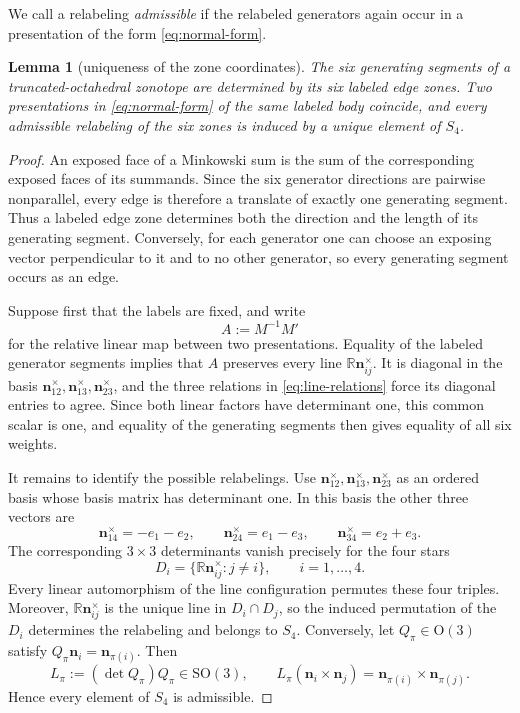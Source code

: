 \documentclass[11pt]{article}
\newcommand{\R}{\mathbb R}
\newcommand{\mb}[1]{\mathbf{#1}}
\newtheorem{lemma}[lemma]{Lemma}
\theoremstyle{remark}
\begin{document}
We call a relabeling \emph{admissible} if the relabeled generators again occur in a
presentation of the form \eqref{eq:normal-form}.

\begin{lemma}[uniqueness of the zone coordinates]\label{lem:zone-uniqueness}
The six generating segments of a truncated-octahedral zonotope are determined by
its six labeled edge zones.  Two presentations in \eqref{eq:normal-form} of the same
labeled body coincide, and every admissible relabeling of the six zones is induced by a
unique element of $S_4$.
\end{lemma}

\begin{proof}
An exposed face of a Minkowski sum is the sum of the corresponding exposed faces of its
summands.  Since the six generator directions are pairwise nonparallel, every edge is
therefore a translate of exactly one generating segment.  Thus a labeled edge zone
determines both the direction and the length of its generating segment.  Conversely, for
each generator one can choose an exposing vector perpendicular to it and to no other
generator, so every generating segment occurs as an edge.

Suppose first that the labels are fixed, and write $$A:=M^{-1}M'$$ for the relative linear map
between two presentations.  Equality of the labeled generator segments implies that $A$
preserves every line $\R\mb n_{ij}^{\times}$.  It is diagonal in the basis
$\mb n_{12}^{\times},\mb n_{13}^{\times},\mb n_{23}^{\times}$, and the three relations
in \eqref{eq:line-relations} force its diagonal entries to agree.  Since both linear
factors have determinant one, this common scalar is one, and equality of the generating
segments then gives equality of all six weights.

It remains to identify the possible relabelings.  Use
$\mb n_{12}^{\times},\mb n_{13}^{\times},\mb n_{23}^{\times}$ as an ordered basis whose basis matrix has determinant one.  In this basis the other three vectors are
\[
 \mb n_{14}^{\times}=-e_1-e_2,\qquad
 \mb n_{24}^{\times}=e_1-e_3,\qquad
 \mb n_{34}^{\times}=e_2+e_3.
\]
The corresponding $3\times3$ determinants vanish precisely for the four stars
\[
 D_i=\{\R\mb n_{ij}^{\times}:j\ne i\},\qquad i=1,\ldots,4.
\]
Every linear automorphism of the line configuration permutes these four triples.  Moreover,
$\R\mb n_{ij}^{\times}$ is the unique line in $D_i\cap D_j$, so the induced permutation of the
$D_i$ determines the relabeling and belongs to $S_4$.  Conversely, let
$Q_\pi\in\mathrm O(3)$ satisfy $Q_\pi\mb n_i=\mb n_{\pi(i)}$.  
Then
$$L_\pi:=(\det Q_\pi)Q_\pi\in\mathrm{SO}(3), \qquad L_\pi(\mb n_i\times\mb n_j)=\mb n_{\pi(i)}\times\mb n_{\pi(j)}.$$
Hence every element of $S_4$ is admissible.
\end{proof}
\end{document}
